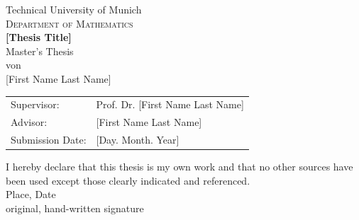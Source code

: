 \documentclass[english,a4paper,10pt,oneside]{scrbook}	%
\theoremstyle{break}
\theoremstyle{remark}
\begin{document}
\pagestyle{empty}       %
  \parbox{1.5cm}{}\hspace{310pt}%
  \parbox{1.5cm}{}%
\vspace*{1.5cm}
\begin{center}
{\Huge Technical University of Munich}
\\
\vspace*{1.5cm}
{\huge \textsc{Department of Mathematics}}
\\
\vspace*{3cm}
{\Huge \textbf{[Thesis Title]}}
\\
\vspace*{3cm}
{\Large Master's Thesis}\linebreak \\
{\Large von}\linebreak \\
{\Large [First Name Last Name]}\\
\vspace*{3cm}
{\Large 
\begin{tabular}{ll}
Supervisor: & Prof. Dr. [First Name Last Name]\\
Advisor: & [First Name Last Name]\\
Submission Date: & [Day. Month. Year]
\end{tabular}
}
\end{center}
\newpage    %

\vspace*{18cm}
\noindent
I hereby declare that this thesis is my own work and that no other sources have been used except those clearly indicated and referenced.
\\[2cm]
Place, Date\\
original, hand-written signature
\newpage
\end{document}
